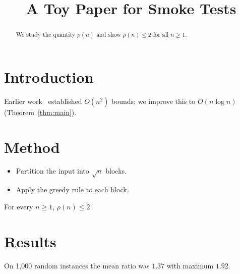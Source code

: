 \documentclass{article}
\title{A Toy Paper for Smoke Tests}
\begin{document}
\maketitle
\begin{abstract}
We study the quantity $\rho(n)$ and show $\rho(n) \le 2$ for all $n \ge 1$. %
\end{abstract}
\section{Introduction}
Earlier work~\cite{a,b} established $O(n^2)$ bounds; we improve this to $O(n \log n)$ (Theorem~\ref{thm:main}).
\section{Method}
\begin{itemize}
\item Partition the input into $\sqrt{n}$ blocks.
\item Apply the greedy rule to each block.
\end{itemize}
\begin{theorem}[Main]\label{thm:main}
For every $n \ge 1$, $\rho(n) \le 2$.
\end{theorem}
\section{Results}
On 1{,}000 random instances the mean ratio was $1.37$ with maximum $1.92$.
\end{document}
